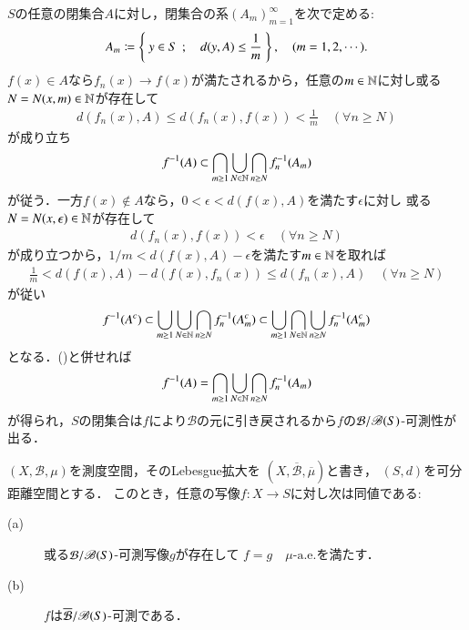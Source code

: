 		\begin{prf}
			$S$の任意の閉集合$A$に対し，閉集合の系$(A_m)_{m=1}^{\infty}$を次で定める:
			\begin{align}
				A_m \coloneqq \left\{\ y \in S\ \, ; \quad d(y,A) \leq \frac{1}{m}\ \right\}, \quad (m=1,2,\cdots).
			\end{align}
			$f(x) \in A$なら$f_n(x) \longrightarrow f(x)$が満たされるから，任意の$m \in \mathbb{N}$に対し或る$N = N(x,m) \in \mathbb{N}$が存在して
			\begin{align}
				d\left( f_n(x),A \right) \leq d\left( f_n(x),f(x) \right) < \frac{1}{m}
				\quad (\forall n \geq N)
			\end{align}
			が成り立ち
			\begin{align}
				f^{-1}(A) \subset \bigcap_{m \geq 1} \bigcup_{N \in \mathbb{N}} \bigcap_{n \geq N} f_n^{-1}(A_m)
				\label{eq:lem_measurability_metric_space}
			\end{align}
			が従う．一方$f(x) \notin A$なら，$0 < \epsilon < d(f(x),A)$を満たす$\epsilon$に対し
			或る$N = N(x,\epsilon) \in \mathbb{N}$が存在して
			\begin{align}
				d\left( f_n(x), f(x) \right) < \epsilon
				\quad (\forall n \geq N)
			\end{align}
			が成り立つから，$1/m < d(f(x),A) - \epsilon$を満たす$m \in \mathbb{N}$を取れば
			\begin{align}
				\frac{1}{m} < d(f(x),A) - d(f(x),f_n(x)) \leq d(f_n(x),A)
				\quad (\forall n \geq N)
			\end{align}
			が従い
			\begin{align}
				f^{-1}(A^c) \subset \bigcup_{m \geq 1} \bigcup_{N \in \mathbb{N}} \bigcap_{n \geq N} f_n^{-1}(A_m^c)
				\subset \bigcup_{m \geq 1} \bigcap_{N \in \mathbb{N}} \bigcup_{n \geq N} f_n^{-1}(A_m^c)
			\end{align}
			となる．()と併せれば
			\begin{align}
				f^{-1}(A) = \bigcap_{m \geq 1} \bigcup_{N \in \mathbb{N}} \bigcap_{n \geq N} f_n^{-1}(A_m)
			\end{align}
			が得られ，$S$の閉集合は$f$により$\mathcal{B}$の元に引き戻されるから$f$の$\mathcal{B}/\mathscr{B}(S)$-可測性が出る．
			\QED
		\end{prf}
		
		\begin{screen}
			\begin{thm}[拡大前後の可測性]\label{thm:measurability_before_after_Lebesgue_extension}
				$(X,\mathcal{B},\mu)$を測度空間，そのLebesgue拡大を
				$\left(X,\overline{\mathcal{B}},\overline{\mu}\right)$と書き，
				$(S,d)$を可分距離空間とする．
				このとき，任意の写像$f:X \longrightarrow S$に対し次は同値である:
				\begin{description}
					\item[(a)] 或る$\mathcal{B}/\mathscr{B}(S)$-可測写像$g$が存在して
						$f = g\quad \mbox{$\mu$-a.e.}$を満たす．
					\item[(b)] $f$は$\overline{\mathcal{B}}/\mathscr{B}(S)$-可測である．
				\end{description}
			\end{thm}
		\end{screen}
		
